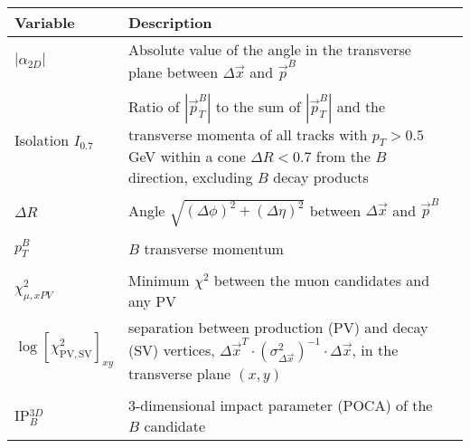 \begin{tabular}{p{2cm} p{10.9cm} p{2.1cm}}
\hline \hline
Variable  &  Description \\ 
\midrule
$|\alpha_{2D}|$ & Absolute value of the angle in the transverse plane
between $\Delta\overrightarrow{x}$ and $\overrightarrow{p}^{B}$ \\ \\   
Isolation $I_{0.7}$ & Ratio of $|\overrightarrow{p}^{B}_{T}|$ to the sum of $|\overrightarrow{p}^{B}_{T}|$ and
the transverse momenta of all tracks with $p_T > 0.5$ GeV within a
cone $\Delta{R} < 0.7$ from the $B$ direction, excluding $B$ decay products  \\ \\  
$\Delta{R}$ & Angle $\sqrt{\left(\Delta\phi\right)^{2} + \left(\Delta\eta\right)^{2}} $
between $\Delta\overrightarrow{x}$ and $\overrightarrow{p}^{B}$ \\ \\  
$p_{T}^{B}$ & $B$ transverse momentum  \\ \\  
$\chi^2_{\mu,xPV}$ & Minimum $\chi^2$ between the muon candidates and any PV  \\  
$\log[\chi^{2}_{\mathrm{PV,SV}}]_{xy}$ & separation between production
(PV) and decay (SV) vertices, $\Delta\overrightarrow{x}^{T}\cdot
\left(\sigma^{2}_{\Delta\overrightarrow{x}}\right)^{-1}\cdot\Delta\overrightarrow{x}$,
in the transverse plane $(x,y)$ \\ \\  
IP$_B^{3D}$ & 3-dimensional impact parameter (POCA) of the $B$ candidate \\  

\end{tabular}
